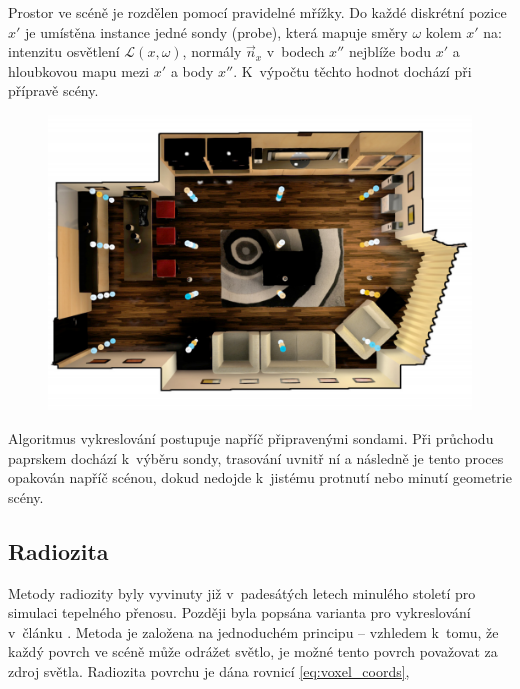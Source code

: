 Prostor ve scéně je rozdělen pomocí pravidelné mřížky. Do každé diskrétní pozice $x'$ je umístěna instance jedné sondy (probe), která mapuje směry $\omega$ kolem $x'$ na: intenzitu osvětlení $\mathcal{L}(x, \omega)$, normály $\vec{n}_x$ v~bodech $x''$ nejblíže bodu $x'$ a hloubkovou mapu mezi $x'$ a body $x''$. K~výpočtu těchto hodnot dochází při přípravě scény.

\begin{figure}[H]
	\centering
	\captionsetup{justification=centering}
	\includegraphics[scale=0.25]{obrazky-figures/light_field_probes.png}
	\label{fig:probes_in_scene}
\end{figure}

Algoritmus vykreslování postupuje napříč připravenými sondami. Při průchodu paprskem dochází k~výběru sondy, trasování uvnitř ní a následně je tento proces opakován napříč scénou, dokud nedojde k~jistému protnutí nebo minutí geometrie scény.

\subsection{Radiozita}
Metody radiozity byly vyvinuty již v~padesátých letech minulého století pro simulaci tepelného přenosu. Později byla popsána varianta pro vykreslování v~článku \cite{radiosity}. Metoda je založena na jednoduchém principu -- vzhledem k~tomu, že každý povrch ve scéně může odrážet světlo, je možné tento povrch považovat za zdroj světla. Radiozita povrchu je dána rovnicí \ref{eq:voxel_coords},



